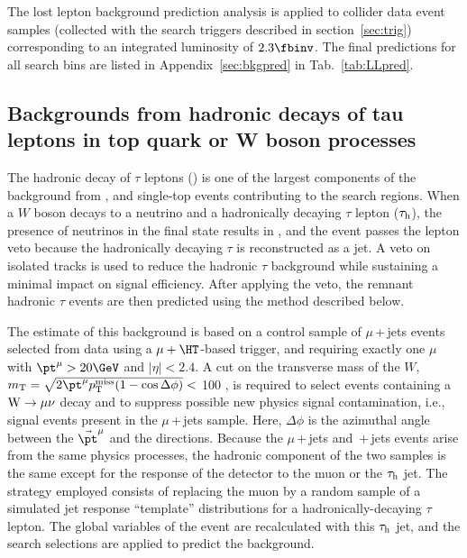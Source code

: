 The lost lepton background prediction analysis is applied to collider data event samples (collected with the search triggers described in section~\ref{sec:trig}) corresponding to an integrated luminosity of $2.3\fbinv$. 
%
The final predictions for all search bins are listed in Appendix~\ref{sec:bkgpred} in Tab.~\ref{tab:LLpred}.

\subsection{Backgrounds from hadronic decays of tau leptons in top quark or W boson processes}


The hadronic decay of $\tau$ leptons (\tauh) is one of the largest components of the background from \ttbar, \wpj and single-top events contributing to the search regions. 
%
When a $W$ boson decays to a neutrino and a hadronically decaying $\tau$ lepton ($\tau_\mathrm{h}$), the presence of neutrinos in the final state results in \METv, and the event passes the lepton veto because the hadronically decaying $\tau$ is reconstructed as a jet. 
%
A veto on isolated tracks is used to reduce the hadronic $\tau$ background while sustaining a minimal impact on signal efficiency. 
%
After applying the veto, the remnant hadronic $\tau$ events are then predicted using the method described below. 

The estimate of this background is based on a control sample of $\mu$\,+\,jets events selected from data using a $\mu+\HT$-based trigger, and requiring exactly one $\mu$ with $\pt^{\mu}>20\GeV$ and $|\eta|<2.4$.
%
A cut on the transverse mass of the $W$, $m_\mathrm{T}=\sqrt{2\pt^{\mu}\MET(1-\cos\Delta\phi)}<$ 100 \gev, is required to select events containing a $\mathrm{W}\to\mu\nu$ decay and to suppress possible new physics signal contamination, i.e., signal events present in the $\mu$\,+\,jets sample. 
%
Here, $\Delta\phi$ is the azimuthal angle between the $\vec{\pt}^\mu$ and the \METv directions.
%
Because the $\mu$\,+\,jets and \tauh{}\,+\,jets events arise from the same physics processes, the hadronic component of the two samples is the same except for the response of the detector to the muon or the $\tau_\mathrm{h}$ jet. 
%
The strategy employed consists of replacing the muon \pt by a random sample of a simulated \tauh jet response ``template'' distributions for a hadronically-decaying $\tau$ lepton. 
%
The global variables of the event are recalculated with this $\tau_\mathrm{h}$ jet, and the search selections are applied to predict the \tauh background.

